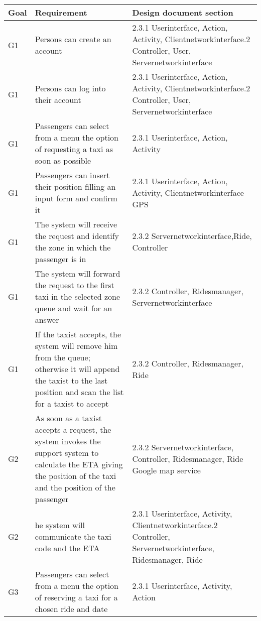 \begin{center}
 \begin{longtable}{| m{5cm} | m{5cm} | m{5cm} | }
 \hline
  Goal & Requirement & Design document section\\
 \hline\hline
 \endhead
   G1&	Persons can create an account& 2.3.1 Userinterface, Action, Activity, Clientnetworkinterface\newline
					2.3.2 Controller, User, Servernetworkinterface\\ \hline
   G1&	Persons can log into their account& 2.3.1 Userinterface, Action, Activity, Clientnetworkinterface\newline
					      2.3.2 Controller, User, Servernetworkinterface\\ \hline
   G1&	Passengers can select from a menu the option of requesting a taxi as soon as possible& 2.3.1 Userinterface, Action, Activity\\ \hline
   G1&	Passengers can insert their position filling an input form and confirm it& 2.3.1 Userinterface, Action, Activity, Clientnetworkinterface\newline 
										    2.1 GPS \\ \hline
   G1&	The system will receive the request and identify the zone in which the passenger is in	& 2.3.2 Servernetworkinterface,Ride, Controller \\ \hline 
   G1&	The system will forward the request to the first taxi in the selected zone queue and wait for an answer	& 2.3.2 Controller, Ridesmanager, Servernetworkinterface\\ \hline
   G1&	If the taxist accepts, the system will remove him from the queue; otherwise it will append the taxist to the last position and
scan the list for a taxist to accept& 2.3.2 Controller, Ridesmanager, Ride\\ \hline
    G2&	As soon as a taxist accepts a request, the system invokes the support system to calculate the ETA giving the position of the 
	taxi and the position of the passenger& 2.3.2 Servernetworkinterface, Controller, Ridesmanager, Ride \newline
						2.5 Google map service\\ \hline
    G2& he system will communicate the taxi code and the ETA& 2.3.1 Userinterface, Activity, Clientnetworkinterface\newline
								2.3.2 Controller, Servernetworkinterface, Ridesmanager, Ride\\ \hline
    G3& Passengers can select from a menu the option of reserving a taxi for a chosen ride and date & 2.3.1 Userinterface, Activity, Action \\ \hline

\end{longtable}
\end{center}
